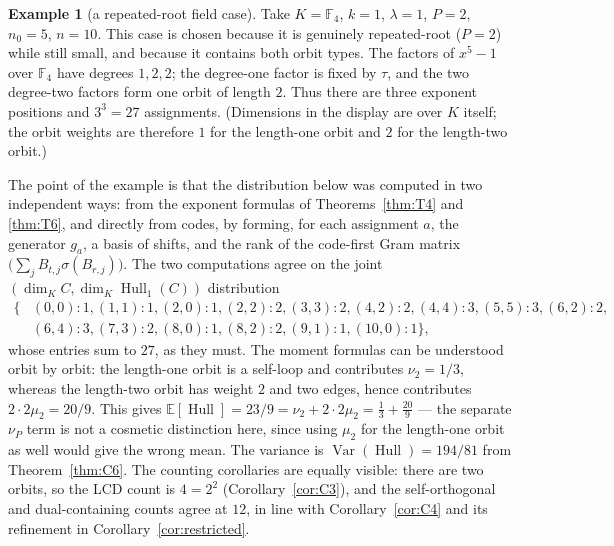 \documentclass[10pt,journal,draftclsnofoot,onecolumn]{IEEEtran}
\theoremstyle{definition}
\newtheorem{example}[theorem]{Example}
\theoremstyle{remark}
\newcommand{\Hull}{\operatorname{Hull}}
\newcommand{\E}{\mathbb{E}}
\begin{document}
\begin{example}[a repeated-root field case]\label{ex:E3}
Take \(K = \mathbb{F}_4\), \(k=1\), \(\lambda=1\), \(P=2\), \(n_0=5\),
\(n=10\). This case is chosen because it is genuinely repeated-root
(\(P=2\)) while still small, and because it contains both orbit types.
The factors of \(x^5-1\) over \(\mathbb{F}_4\) have degrees
\(1,2,2\); the degree-one factor is fixed by \(\tau\), and the two
degree-two factors form one orbit of length \(2\). Thus there are three
exponent positions and \(3^3=27\) assignments. (Dimensions in the
display are over \(K\) itself; the orbit weights are therefore \(1\)
for the length-one orbit and \(2\) for the length-two orbit.)

The point of the example is that the distribution below was computed
in two independent ways: from the exponent formulas of
Theorems~\ref{thm:T4} and \ref{thm:T6}, and directly from codes, by
forming, for each assignment \(a\), the generator \(g_a\), a basis of
shifts, and the rank of the code-first Gram matrix
\(\big(\sum_j B_{t,j}\sigma(B_{r,j})\big)\). The two computations
agree on the joint \((\dim_K C, \dim_K \Hull_1(C))\) distribution
\[
\begin{aligned}
\{&(0,0):1, (1,1):1, (2,0):1, (2,2):2, (3,3):2, (4,2):2, (4,4):3,
(5,5):3, (6,2):2,\\
&(6,4):3, (7,3):2, (8,0):1, (8,2):2, (9,1):1, (10,0):1\},
\end{aligned}
\]
whose entries sum to \(27\), as they must. The moment formulas can be
understood orbit by orbit: the length-one orbit is a self-loop and
contributes \(\nu_2 = 1/3\), whereas the length-two orbit has weight
\(2\) and two edges, hence contributes \(2 \cdot 2\mu_2 = 20/9\).
This gives
\(\E[\Hull] = 23/9 = \nu_2 + 2\cdot 2\mu_2 = \tfrac13 +
\tfrac{20}{9}\) --- the separate \(\nu_P\) term is not a cosmetic
distinction here, since using \(\mu_2\) for the length-one orbit as
well would give the wrong mean. The variance is
\(\operatorname{Var}(\Hull) = 194/81\) from Theorem~\ref{thm:C6}.
The counting corollaries are equally visible: there are two orbits, so
the LCD count is \(4 = 2^2\) (Corollary~\ref{cor:C3}), and the
self-orthogonal and dual-containing counts agree at \(12\), in line
with Corollary~\ref{cor:C4} and its refinement in
Corollary~\ref{cor:restricted}.
\end{example}
\end{document}
